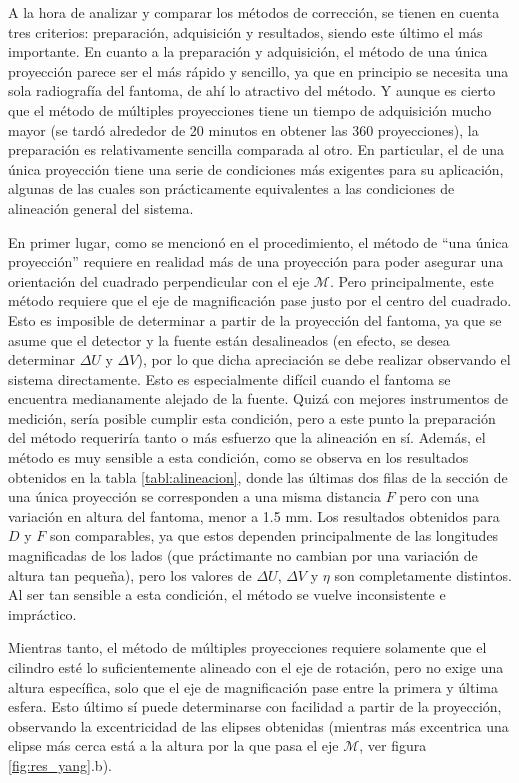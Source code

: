 A la hora de analizar y comparar los métodos de corrección, se tienen en cuenta tres criterios:
preparación, adquisición y resultados, siendo este último el más importante. En cuanto a la preparación
y adquisición, el método de una única proyección parece ser el más rápido y sencillo, ya que en principio
se necesita una sola radiografía del fantoma, de ahí lo atractivo del método. Y aunque es cierto
que el método de múltiples proyecciones tiene un tiempo de adquisición mucho mayor (se tardó alrededor de
20 minutos en obtener las 360 proyecciones), la preparación es relativamente sencilla comparada al otro.
En particular, el de una única proyección tiene una serie de condiciones más exigentes para su aplicación,
algunas de las cuales son prácticamente equivalentes a las condiciones de alineación general del sistema.

En primer lugar, como se mencionó en el procedimiento, el método de ``una única proyección'' requiere en realidad
más de una proyección para poder asegurar una orientación del cuadrado perpendicular con el eje
$\mathcal{M}$. Pero principalmente, este método requiere que el eje de magnificación pase justo por el centro del cuadrado. Esto
es imposible de determinar a partir de la proyección del fantoma, ya que se asume que el detector y la
fuente están desalineados (en efecto, se desea determinar $\Delta U$ y $\Delta V$), por lo que dicha
apreciación se debe realizar observando el sistema directamente. Esto es especialmente difícil cuando
el fantoma se encuentra medianamente alejado de la fuente. Quizá con mejores instrumentos de medición,
sería posible cumplir esta condición, pero a este punto la preparación del método requeriría tanto o más
esfuerzo que la alineación en sí. Además, el método es muy sensible a esta condición, como se observa en
los resultados obtenidos en la tabla \ref{tabl:alineacion}, donde las últimas dos filas de la sección de
una única proyección se corresponden a una misma distancia $F$ pero con una variación en altura del fantoma,
menor a 1.5 mm. Los resultados obtenidos para $D$ y $F$ son comparables, ya que estos dependen principalmente
de las longitudes magnificadas de los lados (que práctimante no cambian por una variación de altura tan pequeña),
pero los valores de $\Delta U$, $\Delta V$ y $\eta$ son completamente distintos. Al ser tan sensible a esta
condición, el método se vuelve inconsistente e impráctico.

Mientras tanto, el método de múltiples proyecciones requiere solamente que el cilindro esté lo suficientemente
alineado con el eje de rotación, pero no exige una altura específica, solo que el eje de magnificación
pase entre la primera y última esfera. Esto último sí puede determinarse con facilidad a partir
de la proyección, observando la excentricidad de las elipses obtenidas (mientras más excentrica una elipse
más cerca está a la altura por la que pasa el eje $\mathcal{M}$, ver figura \ref{fig:res_yang}.b).

